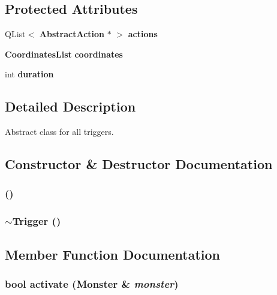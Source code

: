\subsection*{Protected Attributes}
\begin{CompactItemize}
\item 
QList$<$ {\bf Abstract\-Action} $\ast$ $>$ {\bf actions}
\item 
{\bf Coordinates\-List} {\bf coordinates}
\item 
int {\bf duration}
\end{CompactItemize}


\subsection{Detailed Description}
Abstract class for all triggers. 



\subsection{Constructor \& Destructor Documentation}
\subsubsection{ ()}\label{classTrigger_a0}


\subsubsection{\setlength{\rightskip}{0pt plus 5cm}$\sim${\bf Trigger} ()\hspace{0.3cm}{\tt  [virtual]}}\label{classTrigger_a1}




\subsection{Member Function Documentation}
\subsubsection{\setlength{\rightskip}{0pt plus 5cm}bool activate ({\bf Monster} \& {\em monster})}\label{classTrigger_a4}


